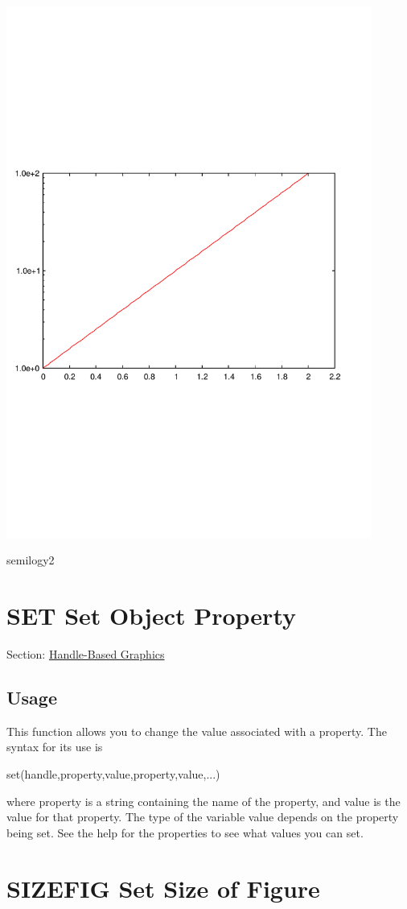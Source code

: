  
\begin{DoxyImage}
\includegraphics[width=12cm]{semilogy2}
\caption{semilogy2}
\end{DoxyImage}
 \hypertarget{handle_set}{}\section{S\-E\-T Set Object Property}\label{handle_set}
Section\-: \hyperlink{sec_handle}{Handle-\/\-Based Graphics} \hypertarget{vtkwidgets_vtkxyplotwidget_Usage}{}\subsection{Usage}\label{vtkwidgets_vtkxyplotwidget_Usage}
This function allows you to change the value associated with a property. The syntax for its use is \begin{DoxyVerb}  set(handle,property,value,property,value,...)
\end{DoxyVerb}
 where {\ttfamily property} is a string containing the name of the property, and {\ttfamily value} is the value for that property. The type of the variable {\ttfamily value} depends on the property being set. See the help for the properties to see what values you can set. \hypertarget{handle_sizefig}{}\section{S\-I\-Z\-E\-F\-I\-G Set Size of Figure}\label{handle_sizefig}
